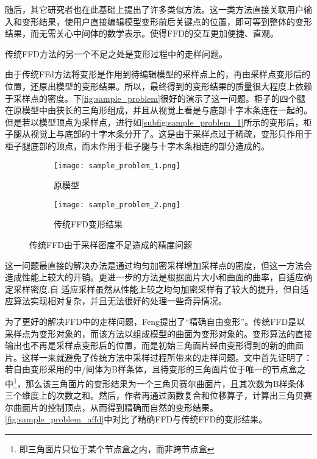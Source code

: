 随后，其它研究者也在此基础上提出了许多类似方法。这一类方法直接关联用户输入和变形结果，使用户直接编辑模型变形前后关键点的位置，即可等到整体的变形结果，而无需关心中间体的数学表示。使得FFD的交互更加便捷、直观。

传统FFD方法的另一个不足之处是变形过程中的走样问题。

由于传统FFd方法将变形是作用到待编辑模型的采样点上的，再由采样点变形后的位置，还原出模型的变形结果。所以，最终得到的变形结果的质量很大程度上依赖于采样点的密度。下\autoref{fig:sample_problem}很好的演示了这一问题。柜子的四个腿在原模型中由狭长的三角形组成，并且从视觉上看是与底部十字木条连在一起的。但是若以模型顶点为采样点，进行如\autoref{subfig:sample_problem_1}所示的变形后，柜子腿从视觉上与底部的十字木条分开了。这是由于采样点过于稀疏，变形只作用于柜子腿底部的顶点，而未作用于柜子腿与十字木条相连的部分造成的。

\begin{figure}[htbp]
	\centering
	\begin{subfigure}[b]{.4\textwidth}
		\centering
		\texttt{[image: sample\_problem\_1.png]}
		\caption{原模型}\label{subfig:sample_problem_0}
	\end{subfigure}
	\quad
	\begin{subfigure}[b]{.4\textwidth}
		\centering
		\texttt{[image: sample\_problem\_2.png]}
		\caption{传统FFD变形结果}\label{subfig:sample_problem_1}
	\end{subfigure}
    \caption{传统FFD由于采样密度不足造成的精度问题}\label{fig:sample_problem}
\end{figure}

这一问题最直接的解决办法是通过均匀加密采样增加采样点的密度，但这一方法会造成性能上较大的开销。更进一步的方法\cite{parry1986, gain1999}是根据面片大小和曲面的曲率，自适应确定采样密度.自
适应采样虽然从性能上较之均匀加密采样有了较大的提升，但自适应算法实现相对复杂，并且无法很好的处理一些奇异情况。


为了更好的解决FFD中的走样问题，Feng\cite{Feng98}提出了“精确自由变形”。传统FFD是以采样点为变形对象的，而该方法以组成模型的曲面为变形对象的。变形算法的直接输出也不再是采样点变形后的位置，而是初始三角面片经由变形得到的新的曲面片。这样一来就避免了传统方法中采样过程所带来的走样问题。文中首先证明了：若自由变形采用的中/间体为B样条体，且待变形的三角面片位于唯一的节点盒之中\footnote{即三角面片只位于某个节点盒之内，而非跨节点盒}，那么该三角面片的变形结果为一个三角贝赛尔曲面片，且其次数为B样条体三个维度上的次数之和。然后，作者再通过函数复合\cite{derose1988, derose1993}和位移算子\cite{chang1984}，计算出三角贝赛尔曲面片的控制顶点，从而得到精确而自然的变形结果。\autoref{fig:sample_problem_affd}中对比了精确FFD与传统FFD的变形结果。

